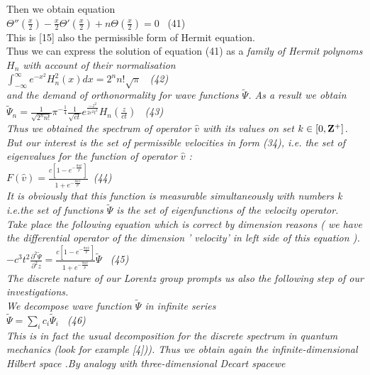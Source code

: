 \documentclass[a4paper,12pt] {article}
\begin{document}
{ Then we obtain equation
\\$  \Theta '' (\frac {x}{2})- \frac {x}{2}  \Theta '(\frac {x}{2} ) +n \Theta (\frac {x}{2} ) =0 $ \ (41)\\
This is [15]  also the permissible form of Hermit  equation.\\Thus we can  express the  solution  of
equation (41)  as a   \it  family of Hermit polynoms $ H_n$  \rm with account of their normalisation
\\$ \int_{-\infty}^{\infty} e^{-x^2} H_n^2(x) dx= 2^n n!\sqrt \pi $ \ (42) \\and the demand of
 orthonormality for wave functions $  \tilde \Psi $. As a result we obtain
\\$ \tilde  \Psi _n =\frac {1}{\sqrt {2^n n!}} \pi^{-\frac {1}{4}} \frac {1}{\sqrt {ct}} e^{\frac{-z^2}{2c^2t^2}} H_n (\frac {z}{ct}) $  \ (43)\\
Thus we obtained the \it spectrum of operator $ \hat v $ \rm with its values on set
 $ k \in [0,\bf Z \rm ^+]$. But our interest is the \it set  of permissible velocities \rm in form (34), i.e. the
 \it set of  eigenvalues  for the function of  operator $ \hat v $ :
\\$ F(\hat v) =  \frac {c[1-e^{-\frac {8 \pi \hat v }{p}}]}{1+ e^{-\frac {8 \pi \hat v   }{p}}} $\rm  \ (44) \\ It
 is obviously \it  that this function is measurable simultaneously with  numbers \rm  k  i.e.\it the set  of
 functions  $  \tilde \Psi $  \it  is the set  of  eigenfunctions of the velocity operator.
\\ \rm Take place the following equation which is correct by dimension reasons ( we have the
 \it differential operator of  the dimension ' velocity' in left side of this equation \rm ).
\\$ - c^3 t^2 \frac {{\partial}^2 \tilde \Psi }{{\partial}^2 z}=\frac  {c[1-e^{-\frac {8 \pi \hat v }{p}}]}{1+ e^{-\frac {8 \pi \hat v   }{p}}}\tilde \Psi  $ \  (45)
 \\ The discrete nature of our Lorentz group prompts us also the following  step of our investigations.
\\ We  decompose wave  function  $\tilde \Psi  $  in  \it  infinite series
 \\$ \tilde \Psi  = \sum _i c_i \tilde \Psi_i $ \rm \ (46) \\ This is in fact the usual decomposition for the
discrete spectrum in quantum mechanics (look for example [4])). Thus we obtain again the
\it infinite-dimensional Hilbert  space .\rm  By analogy with  \it  three-dimensional Decart  space\rm  we
}
\end{document}

